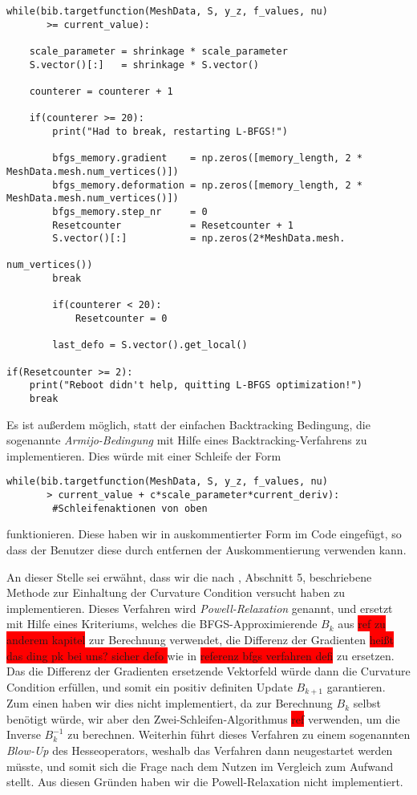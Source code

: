 \documentclass[bibliography=totoc,12pt,a4paper]{scrartcl}
\theoremstyle{exampstyle}
\numberwithin{equation}{section}
\begin{document}
\begin{lstlisting}
while(bib.targetfunction(MeshData, S, y_z, f_values, nu)
       >= current_value):
	
	scale_parameter = shrinkage * scale_parameter
    S.vector()[:]   = shrinkage * S.vector()

    counterer = counterer + 1

	if(counterer >= 20):
    	print("Had to break, restarting L-BFGS!")

        bfgs_memory.gradient    = np.zeros([memory_length, 2 * 																     MeshData.mesh.num_vertices()])
        bfgs_memory.deformation = np.zeros([memory_length, 2 * 																   MeshData.mesh.num_vertices()])
        bfgs_memory.step_nr     = 0
        Resetcounter            = Resetcounter + 1
        S.vector()[:]           = np.zeros(2*MeshData.mesh.
        											           num_vertices())
        break

        if(counterer < 20):
            Resetcounter = 0

        last_defo = S.vector().get_local()

if(Resetcounter >= 2):
    print("Reboot didn't help, quitting L-BFGS optimization!")
    break
\end{lstlisting}

Es ist außerdem möglich, statt der einfachen Backtracking Bedingung, die sogenannte \textit{Armijo-Bedingung} mit Hilfe eines Backtracking-Verfahrens zu implementieren.
Dies würde mit einer Schleife der Form
\begin{lstlisting}
while(bib.targetfunction(MeshData, S, y_z, f_values, nu)
       > current_value + c*scale_parameter*current_deriv):
		#Schleifenaktionen von oben
\end{lstlisting}
funktionieren. Diese haben wir in auskommentierter Form im Code eingefügt, so dass der Benutzer diese durch entfernen der Auskommentierung verwenden kann.

An dieser Stelle sei erwähnt, dass wir die nach \cite{Powell}, Abschnitt 5, beschriebene Methode zur Einhaltung der Curvature Condition versucht haben zu implementieren. Dieses Verfahren wird \textit{Powell-Relaxation} genannt, und ersetzt mit Hilfe eines Kriteriums, welches die BFGS-Approximierende $B_k$ aus \colorbox{red}{ref zu anderem kapitel} zur Berechnung verwendet, die Differenz der Gradienten  \colorbox{red}{heißt das ding pk bei uns? sicher defo
} wie in \colorbox{red}{referenz bfgs verfahren defi} zu ersetzen. Das die Differenz der Gradienten ersetzende Vektorfeld würde dann die Curvature Condition erfüllen, und somit ein positiv definiten Update $B_{k+1}$ garantieren. Zum einen haben wir dies nicht implementiert, da zur Berechnung $B_k$ selbst benötigt würde, wir aber den Zwei-Schleifen-Algorithmus \colorbox{red}{ref} verwenden, um die Inverse $B_k^{-1}$ zu berechnen. Weiterhin führt dieses Verfahren zu einem sogenannten \textit{Blow-Up} des Hesseoperators, weshalb das Verfahren dann neugestartet werden müsste, und somit sich die Frage nach dem Nutzen im Vergleich zum Aufwand stellt. Aus diesen Gründen haben wir die Powell-Relaxation nicht implementiert.
\end{document}
